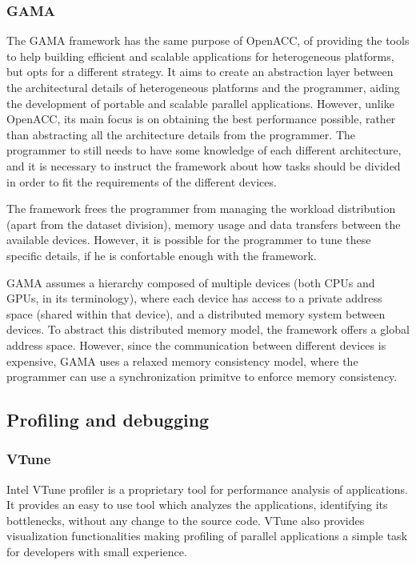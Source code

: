 \subsubsection*{GAMA}
\label{GAMA}

The GAMA framework \cite{GAMA} has the same purpose of OpenACC, of providing the tools to help building efficient and scalable applications for heterogeneous platforms, but opts for a different strategy. It aims to create an abstraction layer between the architectural details of heterogeneous platforms and the programmer, aiding the development of portable and scalable parallel applications. However, unlike OpenACC, its main focus is on obtaining the best performance possible, rather than abstracting all the architecture details from the programmer. The programmer to still needs to have some knowledge of each different architecture, and it is necessary to instruct the framework about how tasks should be divided in order to fit the requirements of the different devices.

The framework frees the programmer from managing the workload distribution (apart from the dataset division), memory usage and data transfers between the available devices. However, it is possible for the programmer to tune these specific details, if he is confortable enough with the framework.

GAMA assumes a hierarchy composed of multiple devices (both CPUs and GPUs, in its terminology), where each device has access to a private address space (shared within that device), and a distributed memory system between devices. To abstract this distributed memory model, the framework offers a global address space. However, since the communication between different devices is expensive, GAMA uses a relaxed memory consistency model, where the programmer can use a synchronization primitve to enforce memory consistency.

\subsection{Profiling and debugging}
\label{ProfilingDebugging}

\subsubsection*{VTune}
\label{VTune}

Intel VTune profiler \cite{Intel:VTune} is a proprietary tool for performance analysis of applications. It provides an easy to use tool which analyzes the applications, identifying its bottlenecks, without any change to the source code. VTune also provides visualization functionalities making profiling of parallel applications a simple task for developers with small experience.

